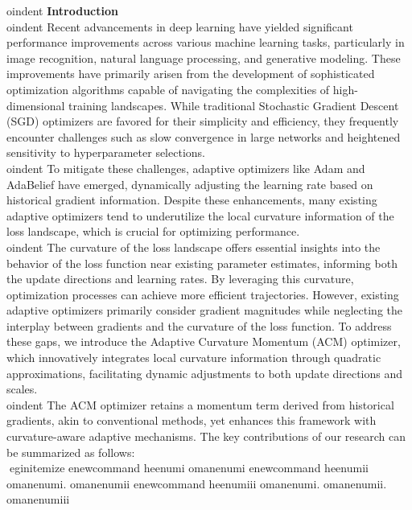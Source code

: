 \documentclass{article} %
\begin{document}
oindent \textbf{Introduction}  \\ 
oindent Recent advancements in deep learning have yielded significant performance improvements across various machine learning tasks, particularly in image recognition, natural language processing, and generative modeling. These improvements have primarily arisen from the development of sophisticated optimization algorithms capable of navigating the complexities of high-dimensional training landscapes. While traditional Stochastic Gradient Descent (SGD) optimizers are favored for their simplicity and efficiency, they frequently encounter challenges such as slow convergence in large networks and heightened sensitivity to hyperparameter selections. \\ 
oindent To mitigate these challenges, adaptive optimizers like Adam \cite{Adam2014} and AdaBelief \cite{AdaBelief2021} have emerged, dynamically adjusting the learning rate based on historical gradient information. Despite these enhancements, many existing adaptive optimizers tend to underutilize the local curvature information of the loss landscape, which is crucial for optimizing performance.
 \\ 
oindent The curvature of the loss landscape offers essential insights into the behavior of the loss function near existing parameter estimates, informing both the update directions and learning rates. By leveraging this curvature, optimization processes can achieve more efficient trajectories. However, existing adaptive optimizers primarily consider gradient magnitudes while neglecting the interplay between gradients and the curvature of the loss function. To address these gaps, we introduce the Adaptive Curvature Momentum (ACM) optimizer, which innovatively integrates local curvature information through quadratic approximations, facilitating dynamic adjustments to both update directions and scales. \\ 
oindent The ACM optimizer retains a momentum term derived from historical gradients, akin to conventional methods, yet enhances this framework with curvature-aware adaptive mechanisms. The key contributions of our research can be summarized as follows:  \\ egin{itemize}  
enewcommand{	heenumi}{
oman{enumi}}  
enewcommand{	heenumii}{
oman{enumi}. 
oman{enumii}}  
enewcommand{	heenumiii}{
oman{enumi}. 
oman{enumii}. 
oman{enumiii}}  
\end{document}
